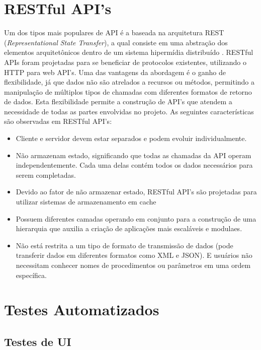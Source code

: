 \section{RESTful API's}
Um dos tipos mais populares de API é a baseada na arquitetura REST (\textit{Representational State Transfer}), a qual consiste em uma abstração dos elementos arquitetônicos dentro de um sistema hipermídia distribuído . 
RESTful APIs foram projetadas para se beneficiar de protocolos existentes, utilizando o HTTP para web API's. Uma das vantagens da abordagem é o ganho de flexibilidade, já que dados não são atrelados a recursos ou métodos, permitindo a manipulação de múltiplos tipos de chamadas com diferentes formatos de retorno de dados. Esta flexibilidade permite a construção de API's que atendem a necessidade de todas as partes envolvidas no projeto. As seguintes características são observadas em RESTful API's:

\begin{itemize}
    \item Cliente e servidor devem estar separados e podem evoluir individualmente.
    \item Não armazenam estado, significando que todas as chamadas da API operam independentemente. Cada uma delas contém todos os dados necessários para serem completadas.
    \item Devido ao fator de não armazenar estado, RESTful API's são projetadas para utilizar sistemas de armazenamento em cache
    \item Possuem diferentes camadas operando em conjunto para a construção de uma hierarquia que auxilia a criação de aplicações mais escaláveis e modulaes.
    \item Não está restrita a um tipo de formato de transmissão de dados (pode transferir dados em diferentes formatos como XML e JSON). E usuários não necessitam conhecer nomes de procedimentos ou parâmetros em uma ordem específica.
\end{itemize}

\section{Testes Automatizados}
\subsection{Testes de UI}
